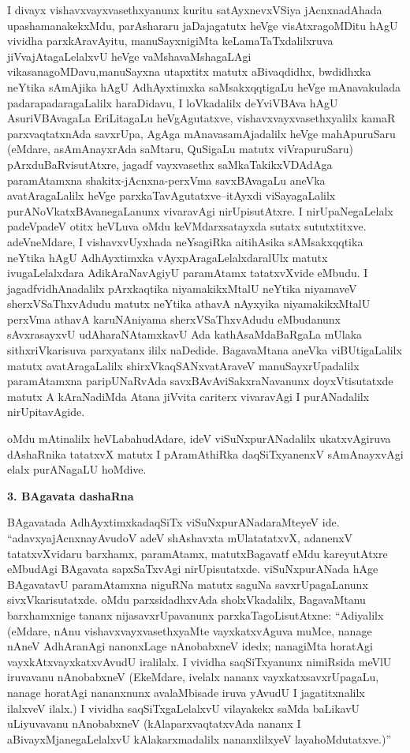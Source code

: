 I divayx vishavxvayxvasethxyanunx kuritu satAyxnevxVSiya jAcnxnadAhada upashamanakekxMdu, parAshararu jaDajagatutx heVge visAtxragoMDitu hAgU vividha parxkAravAyitu, manuSayx\-nigiMta keLamaTaTxdalilxruva jiVvajAtagaLelalxvU heVge vaMshavaMshagaLAgi vikasana\-goMDavu,\break manuSayxna utapxtitx matutx aBivaqdidhx, bwdidhxka neYtika sAmAjika hAgU AdhAyxtimxka saMsakxqqti\-gaLu heVge mAnavakulada padarapadaragaLalilx haraDidavu, I loVkadalilx deYviVBAva hAgU AsuriVBAvagaLa EriLitagaLu heVgAgutatxve, vishavxvayxvasethxyalilx kamaR parxvaqtatx\-nAda savxrUpa, AgAga mAnavasamAjadalilx heVge mahApuruSaru (eMdare, asAmAnayxrAda saMtaru, QuSigaLu matutx viVrapuruSaru) pArxduBaRvisutAtxre, jagadf vayxvasethx saMkaTakikxVDAdAga paramAtamxna shakitx-jAcnxna-perxVma savxBAvagaLu aneVka avatAragaLalilx heVge parxkaTavAgutatxve--itAyxdi viSayagaLalilx purANoVkatxBAvanegaLanunx vivaravAgi nirUpisutAtxre. I nirUpaNegaLelalx padeVpadeV otitx heVLuva oMdu keVMdarxsatayxda sutatx sututxtitxve. adeVneMdare, I vishavxvUyxhada neYsagiRka aitihAsika sAMsakxqqtika neYtika hAgU AdhAyxtimxka vAyxpAragaLelalxdaralUlx matutx ivugaLelalxdara AdikAraNavAgiyU paramAtamx tatatxvXvide eMbudu. I jagadfvidhAnadalilx pArxkaqtika niyamakikxMtalU neYtika niyamaveV sherxVSaThxvAdudu matutx neYtika athavA nAyxyika niyamakikxMtalU perxVma athavA karuNAniyama sherxVSaThxvAdudu eMbudanunx sAvxrasayxvU udAharaNAtamxkavU Ada kathAsaMdaBaRgaLa mUlaka sithxriVkarisuva parxyatanx ililx naDedide. BagavaMtana aneVka viBUtigaLalilx matutx avatAragaLalilx shirxVkaqSANxvatAraveV manuSayxrUpadalilx paramAtamxna paripUNaRvAda savxBAvAviSakxraNavanunx doyxVtisutatxde matutx A kAraNadiMda Atana jiVvita cariterx vivaravAgi I purANadalilx nirUpitavAgide.

oMdu mAtinalilx heVLabahudAdare, ideV viSuNxpurANadalilx ukatxvAgiruva dAshaRnika tatatxvX matutx I pAramAthiRka daqSiTxyanenxV sAmAnayxvAgi elalx purANagaLU hoMdive.

\bigskip
\begin{center}
{\Large\bf 3. BAgavata dashaRna}
\end{center}

BAgavatada AdhAyxtimxkadaqSiTx viSuNxpurANadaraMteyeV ide. ``adavxyajAcnxna\break \hbox{yAvudoV} adeV shAshavxta mUlatatatxvX, adanenxV tatatxvXvidaru barxhamx, paramAtamx, matutx\break Bagavatf eMdu kareyutAtxre eMbudAgi BAgavata sapxSaTxvAgi nirUpisutatxde. viSuNx\-purANada hAge BAgavatavU paramAtamxna niguRNa matutx saguNa savxrUpagaLanunx sivxVkari\-sutatxde. oMdu parxsidadhxvAda sholxVkadalilx, BagavaMtanu barxhamxnige tananx nijasavxrUpavanunx parxkaTa\-goLisutAtxne: ``Adiyalilx (eMdare, nAnu vishavxvayxvasethxyaMte vayxkatxvAguva muMce, nanage nAneV AdhAranAgi nanonxLage nAnobabxneV idedx; nanagiMta horatAgi vayxkAtxvayxkatx\-vAvudU iralilalx. I vividha saqSiTxyanunx nimiRsida meVlU iruvavanu nAnobabxneV (EkeMdare, ivelalx nananx vayxkatxsavxrUpagaLu, nanage horatAgi nananxnunx avalaMbisade iruva yAvudU I jagatitxnalilx ilalxveV ilalx.) I vividha saqSiTxgaLelalxvU vilayakekx saMda baLikavU uLiyuvavanu nAnobabxneV (kAlaparxvaqtatxvAda nananx I aBivayxMjanegaLelalxvU kAlakarxmadalilx nananxlilxyeV layahoMdutatxve.)''

